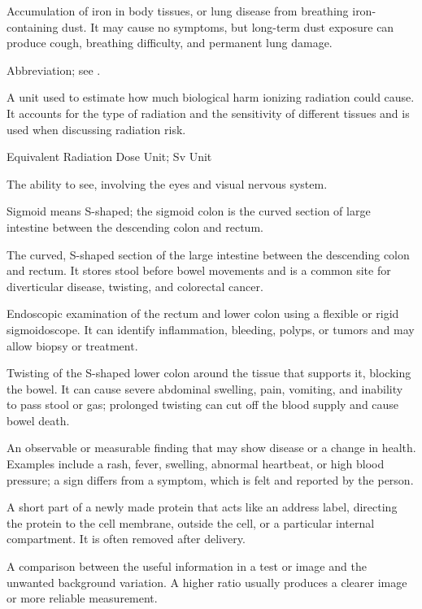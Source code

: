  Accumulation of iron in body tissues, or lung disease from breathing iron-containing dust. It may cause no symptoms, but long-term dust exposure can produce cough, breathing difficulty, and permanent lung damage.

 Abbreviation; see .

 A unit used to estimate how much biological harm ionizing radiation could cause. It accounts for the type of radiation and the sensitivity of different tissues and is used when discussing radiation risk.

\synonyms
Equivalent Radiation Dose Unit; Sv Unit

 The ability to see, involving the eyes and visual nervous system.

 Sigmoid means S-shaped; the sigmoid colon is the curved section of large intestine between the descending colon and rectum.

 The curved, S-shaped section of the large intestine between the descending colon and rectum. It stores stool before bowel movements and is a common site for diverticular disease, twisting, and colorectal cancer.

 Endoscopic examination of the rectum and lower colon using a flexible or rigid sigmoidoscope. It can identify inflammation, bleeding, polyps, or tumors and may allow biopsy or treatment.

 Twisting of the S-shaped lower colon around the tissue that supports it, blocking the bowel. It can cause severe abdominal swelling, pain, vomiting, and inability to pass stool or gas; prolonged twisting can cut off the blood supply and cause bowel death.

 An observable or measurable finding that may show disease or a change in health. Examples include a rash, fever, swelling, abnormal heartbeat, or high blood pressure; a sign differs from a symptom, which is felt and reported by the person.

 A short part of a newly made protein that acts like an address label, directing the protein to the cell membrane, outside the cell, or a particular internal compartment. It is often removed after delivery.

 A comparison between the useful information in a test or image and the unwanted background variation. A higher ratio usually produces a clearer image or more reliable measurement.

